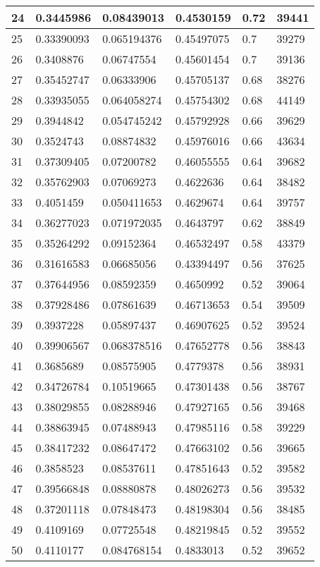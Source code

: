\begin{longtable}{|l|l|l|l|l|l|}
24 & 0.3445986 & 0.08439013 & 0.4530159 & 0.72 & 39441 \\ \hline 
25 & 0.33390093 & 0.065194376 & 0.45497075 & 0.7 & 39279 \\ \hline 
26 & 0.3408876 & 0.06747554 & 0.45601454 & 0.7 & 39136 \\ \hline 
27 & 0.35452747 & 0.06333906 & 0.45705137 & 0.68 & 38276 \\ \hline 
28 & 0.33935055 & 0.064058274 & 0.45754302 & 0.68 & 44149 \\ \hline 
29 & 0.3944842 & 0.054745242 & 0.45792928 & 0.66 & 39629 \\ \hline 
30 & 0.3524743 & 0.08874832 & 0.45976016 & 0.66 & 43634 \\ \hline 
31 & 0.37309405 & 0.07200782 & 0.46055555 & 0.64 & 39682 \\ \hline 
32 & 0.35762903 & 0.07069273 & 0.4622636 & 0.64 & 38482 \\ \hline 
33 & 0.4051459 & 0.050411653 & 0.4629674 & 0.64 & 39757 \\ \hline 
34 & 0.36277023 & 0.071972035 & 0.4643797 & 0.62 & 38849 \\ \hline 
35 & 0.35264292 & 0.09152364 & 0.46532497 & 0.58 & 43379 \\ \hline 
36 & 0.31616583 & 0.06685056 & 0.43394497 & 0.56 & 37625 \\ \hline 
37 & 0.37644956 & 0.08592359 & 0.4650992 & 0.52 & 39064 \\ \hline 
38 & 0.37928486 & 0.07861639 & 0.46713653 & 0.54 & 39509 \\ \hline 
39 & 0.3937228 & 0.05897437 & 0.46907625 & 0.52 & 39524 \\ \hline 
40 & 0.39906567 & 0.068378516 & 0.47652778 & 0.56 & 38843 \\ \hline 
41 & 0.3685689 & 0.08575905 & 0.4779378 & 0.56 & 38931 \\ \hline 
42 & 0.34726784 & 0.10519665 & 0.47301438 & 0.56 & 38767 \\ \hline 
43 & 0.38029855 & 0.08288946 & 0.47927165 & 0.56 & 39468 \\ \hline 
44 & 0.38863945 & 0.07488943 & 0.47985116 & 0.58 & 39229 \\ \hline 
45 & 0.38417232 & 0.08647472 & 0.47663102 & 0.56 & 39665 \\ \hline 
46 & 0.3858523 & 0.08537611 & 0.47851643 & 0.52 & 39582 \\ \hline 
47 & 0.39566848 & 0.08880878 & 0.48026273 & 0.56 & 39532 \\ \hline 
48 & 0.37201118 & 0.07848473 & 0.48198304 & 0.56 & 38485 \\ \hline 
49 & 0.4109169 & 0.07725548 & 0.48219845 & 0.52 & 39552 \\ \hline 
50 & 0.4110177 & 0.084768154 & 0.4833013 & 0.52 & 39652 \\ \hline 
\end{longtable}